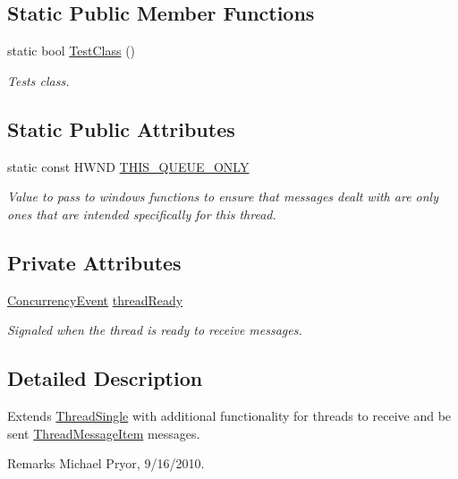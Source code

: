 \subsection*{Static Public Member Functions}
\begin{DoxyCompactItemize}
\item 
static bool \hyperlink{class_thread_single_message_a1bd833e3ffcd36b3cfe26648a7e74625}{TestClass} ()
\begin{DoxyCompactList}\small\item\em Tests class. \item\end{DoxyCompactList}\end{DoxyCompactItemize}
\subsection*{Static Public Attributes}
\begin{DoxyCompactItemize}
\item 
\hypertarget{class_thread_single_message_adc4e41d8cb0847c6e340951172bd23af}{
static const HWND \hyperlink{class_thread_single_message_adc4e41d8cb0847c6e340951172bd23af}{THIS\_\-QUEUE\_\-ONLY}}
\label{class_thread_single_message_adc4e41d8cb0847c6e340951172bd23af}

\begin{DoxyCompactList}\small\item\em Value to pass to windows functions to ensure that messages dealt with are only ones that are intended specifically for this thread. \item\end{DoxyCompactList}\end{DoxyCompactItemize}
\subsection*{Private Attributes}
\begin{DoxyCompactItemize}
\item 
\hyperlink{class_concurrency_event}{ConcurrencyEvent} \hyperlink{class_thread_single_message_ae120ad936311a2c422789a8a5b3d7304}{threadReady}
\begin{DoxyCompactList}\small\item\em Signaled when the thread is ready to receive messages. \item\end{DoxyCompactList}\end{DoxyCompactItemize}


\subsection{Detailed Description}
Extends \hyperlink{class_thread_single}{ThreadSingle} with additional functionality for threads to receive and be sent \hyperlink{class_thread_message_item}{ThreadMessageItem} messages. \begin{DoxyRemark}{Remarks}
Michael Pryor, 9/16/2010. 
\end{DoxyRemark}


